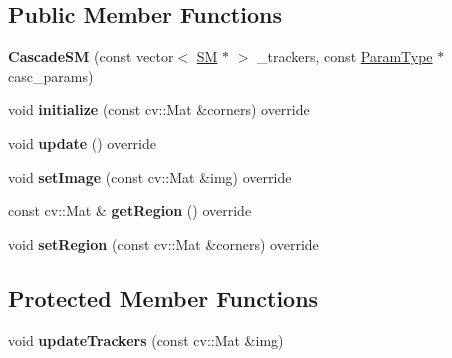 \subsection*{Public Member Functions}
\begin{DoxyCompactItemize}
\item 
\hypertarget{classCascadeSM_a513ca9d591958b20edd5578fe3e008ea}{{\bfseries Cascade\-S\-M} (const vector$<$ \hyperlink{classSearchMethod}{S\-M} $\ast$ $>$ \-\_\-trackers, const \hyperlink{structCascadeParams}{Param\-Type} $\ast$casc\-\_\-params)}\label{classCascadeSM_a513ca9d591958b20edd5578fe3e008ea}

\item 
\hypertarget{classCascadeSM_aaf5ad7cc2386611fc1fe89ee51b98be5}{void {\bfseries initialize} (const cv\-::\-Mat \&corners) override}\label{classCascadeSM_aaf5ad7cc2386611fc1fe89ee51b98be5}

\item 
\hypertarget{classCascadeSM_a259830554eba3cde05b22ac2987b0619}{void {\bfseries update} () override}\label{classCascadeSM_a259830554eba3cde05b22ac2987b0619}

\item 
\hypertarget{classCascadeSM_adb874c060f5afc2ad6f254d036982b66}{void {\bfseries set\-Image} (const cv\-::\-Mat \&img) override}\label{classCascadeSM_adb874c060f5afc2ad6f254d036982b66}

\item 
\hypertarget{classCascadeSM_a0e1062fb079385a9401f38c1d07ed973}{const cv\-::\-Mat \& {\bfseries get\-Region} () override}\label{classCascadeSM_a0e1062fb079385a9401f38c1d07ed973}

\item 
\hypertarget{classCascadeSM_a4da53dbe64b328cee42ebbea97ad312c}{void {\bfseries set\-Region} (const cv\-::\-Mat \&corners) override}\label{classCascadeSM_a4da53dbe64b328cee42ebbea97ad312c}

\end{DoxyCompactItemize}
\subsection*{Protected Member Functions}
\begin{DoxyCompactItemize}
\item 
\hypertarget{classCascadeSM_a103a9c3e9d7fd24d635a5e712ab63d5c}{void {\bfseries update\-Trackers} (const cv\-::\-Mat \&img)}\label{classCascadeSM_a103a9c3e9d7fd24d635a5e712ab63d5c}

\end{DoxyCompactItemize}
